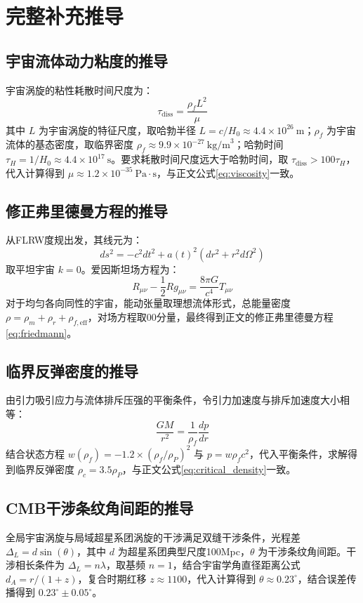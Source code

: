 \documentclass[aps,prd,preprint,superscriptaddress,floatfix]{revtex4-2}
\begin{document}
\section{完整补充推导}
\subsection{宇宙流体动力粘度的推导}
宇宙涡旋的粘性耗散时间尺度为：
$$\tau_{\text{diss}}=\frac{\rho_{f} L^{2}}{\mu}$$
其中 $L$ 为宇宙涡旋的特征尺度，取哈勃半径 $L=c / H_{0} \approx 4.4 \times 10^{26} \ \text{m}$；$\rho_{f}$ 为宇宙流体的基态密度，取临界密度 $\rho_{f} \approx 9.9 \times 10^{-27} \ \text{kg/m}^3$；哈勃时间 $\tau_{H}=1 / H_{0} \approx 4.4 \times 10^{17} \ \text{s}$。要求耗散时间尺度远大于哈勃时间，取 $\tau_{\text{diss}}>100 \tau_{H}$，代入计算得到 $\mu \approx 1.2 \times 10^{-35} \ \text{Pa} \cdot \text{s}$，与正文公式\eqref{eq:viscosity}一致。

\subsection{修正弗里德曼方程的推导}
从FLRW度规出发，其线元为：
$$ds^{2}=-c^{2} d t^{2}+a(t)^{2}(d r^{2}+r^{2} d \Omega^{2})$$
取平坦宇宙 $k=0$。爱因斯坦场方程为：
$$R_{\mu \nu}-\frac{1}{2} R g_{\mu \nu}=\frac{8 \pi G}{c^{4}} T_{\mu \nu}$$
对于均匀各向同性的宇宙，能动张量取理想流体形式，总能量密度 $\rho=\rho_{m}+\rho_{r}+\rho_{f, \mathrm{eff}}$，对场方程取00分量，最终得到正文的修正弗里德曼方程\eqref{eq:friedmann}。

\subsection{临界反弹密度的推导}
由引力吸引应力与流体排斥压强的平衡条件，令引力加速度与排斥加速度大小相等：
$$\frac{G M}{r^{2}}=\frac{1}{\rho_{f}} \frac{d p}{d r}$$
结合状态方程 $w(\rho_{f})=-1.2 \times(\rho_{f} / \rho_{P})^{2}$ 与 $p=w \rho_{f} c^{2}$，代入平衡条件，求解得到临界反弹密度 $\rho_{c}=3.5 \rho_{P}$，与正文公式\eqref{eq:critical_density}一致。

\subsection{CMB干涉条纹角间距的推导}
全局宇宙涡旋与局域超星系团涡旋的干涉满足双缝干涉条件，光程差 $\Delta_{L}=d \sin (\theta)$，其中 $d$ 为超星系团典型尺度100Mpc，$\theta$ 为干涉条纹角间距。干涉相长条件为 $\Delta_{L}=n \lambda$，取基频 $n=1$，结合宇宙学角直径距离公式 $d_{A}=r /(1+z)$，复合时期红移 $z \approx 1100$，代入计算得到 $\theta \approx 0.23^\circ$，结合误差传播得到 $0.23^\circ \pm 0.05^\circ$。
\end{document}
